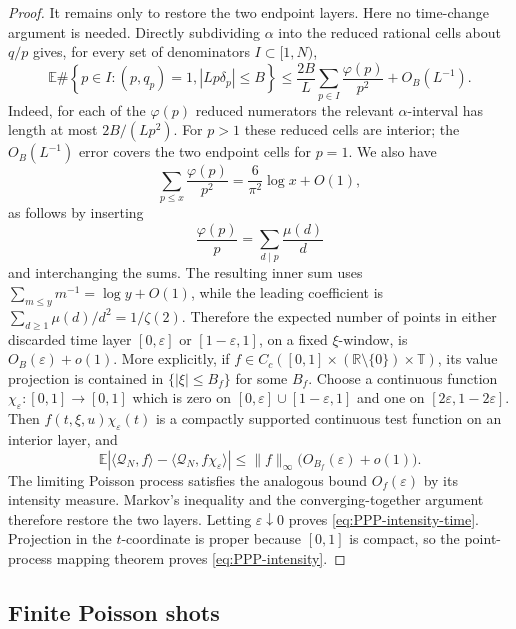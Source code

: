 \documentclass[11pt]{article}
\numberwithin{equation}{section}
\theoremstyle{definition}
\newcommand{\T}{\mathbb T}
\newcommand{\R}{\mathbb R}
\newcommand{\E}{\mathbb E}
\newcommand{\1}{\mathbf 1}
\begin{document}
\begin{proof}
It remains only to restore the two endpoint layers.  Here no time-change
argument is needed.  Directly subdividing \(\alpha\) into the reduced
rational cells about \(q/p\) gives, for every set of denominators
\(I\subset[1,N)\),
\begin{equation}\label{eq:endpoint-cell-count}
 \E\#\left\{p\in I:(p,q_p)=1,
                  |Lp\delta_p|\le B\right\}
 \le \frac{2B}{L}\sum_{p\in I}\frac{\varphi(p)}{p^2}
      +O_B(L^{-1}).
\end{equation}
Indeed, for each of the \(\varphi(p)\) reduced numerators the relevant
\(\alpha\)-interval has length at most \(2B/(Lp^2)\).  For \(p>1\)
these reduced cells are interior; the \(O_B(L^{-1})\) error covers the
two endpoint cells for \(p=1\).  We also have
\[
 \sum_{p\le x}\frac{\varphi(p)}{p^2}
 =\frac6{\pi^2}\log x+O(1),
\]
as follows by inserting
\[
 \frac{\varphi(p)}p=\sum_{d\mid p}\frac{\mu(d)}d
\]
and interchanging the sums.  The resulting inner sum uses
\(\sum_{m\le y}m^{-1}=\log y+O(1)\), while the leading coefficient is
\(\sum_{d\ge1}\mu(d)/d^2=1/\zeta(2)\).
Therefore the expected number of points in either discarded time layer
\([0,\varepsilon]\) or \([1-\varepsilon,1]\), on a fixed
\(\xi\)-window, is \(O_B(\varepsilon)+o(1)\).  More explicitly, if
\(f\in C_c([0,1]\times(\R\setminus\{0\})\times\T)\), its value
projection is contained in \(\{|\xi|\le B_f\}\) for some \(B_f\).
Choose a continuous function
\(\chi_\varepsilon:[0,1]\to[0,1]\) which is zero on
\([0,\varepsilon]\cup[1-\varepsilon,1]\) and one on
\([2\varepsilon,1-2\varepsilon]\).  Then
\(f(t,\xi,u)\chi_\varepsilon(t)\) is a compactly supported continuous
test function on an interior layer, and
\[
 \E\left|
 \langle\mathcal Q_N,f\rangle
 -\langle\mathcal Q_N,
          f\chi_\varepsilon\rangle
 \right|
 \le \|f\|_\infty\bigl(O_{B_f}(\varepsilon)+o(1)\bigr).
\]
The limiting Poisson process satisfies the analogous bound
\(O_f(\varepsilon)\) by its intensity measure.  Markov's inequality
and the converging-together argument therefore restore the two layers.
Letting \(\varepsilon\downarrow0\) proves
\eqref{eq:PPP-intensity-time}.  Projection in the \(t\)-coordinate is
proper because \([0,1]\) is compact, so the point-process mapping theorem
proves \eqref{eq:PPP-intensity}.
\end{proof}
 
\subsection{Finite Poisson shots}
\end{document}
